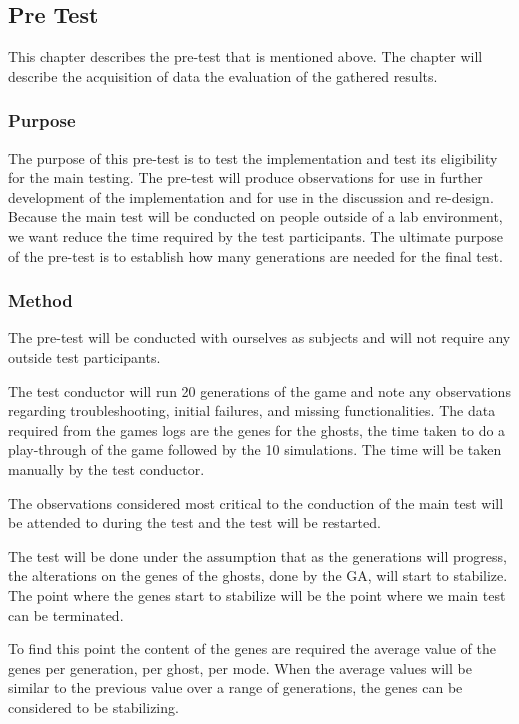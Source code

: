 \subsection{Pre Test} \label{ssec:pretest}
This chapter describes the pre-test that is mentioned above.
The chapter will describe the acquisition of data the evaluation of the gathered results.

\subsubsection{Purpose}
The purpose of this pre-test is to test the implementation and test its eligibility for the main testing.
The pre-test will produce observations for use in further development of the implementation and for use in the discussion and re-design.
Because the main test will be conducted on people outside of a lab environment, we want reduce the time required by the test participants.
The ultimate purpose of the pre-test is to establish how many generations are needed for the final test.

\subsubsection{Method}
The pre-test will be conducted with ourselves as subjects and will not require any outside test participants.

The test conductor will run 20 generations of the game and note any observations regarding troubleshooting, initial failures, and missing functionalities.
The data required from the games logs are the genes for the ghosts, the time taken to do a play-through of the game followed by the 10 simulations.
The time will be taken manually by the test conductor.

The observations considered most critical to the conduction of the main test will be attended to during the test and the test will be restarted.

The test will be done under the assumption that as the generations will progress, the alterations on the genes of the ghosts, done by the GA, will start to stabilize.
The point where the genes start to stabilize will be the point where we main test can be terminated.

To find this point the content of the genes are required the average value of the genes per generation, per ghost, per mode.
When the average values will be similar to the previous value over a range of generations, the genes can be considered to be stabilizing.

